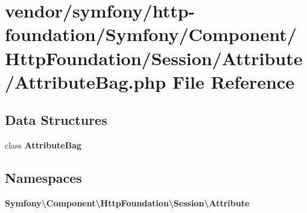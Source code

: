 \section{vendor/symfony/http-\/foundation/\+Symfony/\+Component/\+Http\+Foundation/\+Session/\+Attribute/\+Attribute\+Bag.php File Reference}
\label{_attribute_bag_8php}
\subsection*{Data Structures}
\begin{DoxyCompactItemize}
\item 
class {\bf Attribute\+Bag}
\end{DoxyCompactItemize}
\subsection*{Namespaces}
\begin{DoxyCompactItemize}
\item 
 {\bf Symfony\textbackslash{}\+Component\textbackslash{}\+Http\+Foundation\textbackslash{}\+Session\textbackslash{}\+Attribute}
\end{DoxyCompactItemize}
